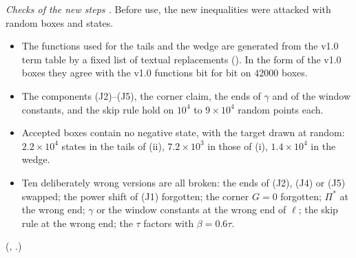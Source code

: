 \emph{Checks of the new steps \numst.}
Before use, the new inequalities were attacked with random boxes and states.
\begin{itemize}
\item The functions used for the tails and the wedge are generated from the v1.0 term table by a fixed list of textual replacements ().
  In the form of the v1.0 boxes they agree with the v1.0 functions bit for bit on $42000$ boxes.
\item The components (J2)--(J5), the corner claim, the ends of $\gamma$ and of the window constants, and the skip rule hold on $10^4$ to $9\times10^4$ random points each.
\item Accepted boxes contain no negative state, with the target drawn at random: $2.2\times10^{4}$ states in the tails of (ii), $7.2\times10^{3}$ in those of (i), $1.4\times10^{4}$ in the wedge.
\item Ten deliberately wrong versions are all broken: the ends of (J2), (J4) or (J5) swapped; the power shift of (J1) forgotten; the corner $G=0$ forgotten; $\Pi^*$ at the wrong end; $\gamma$ or the window constants at the wrong end of $\ell$; the skip rule at the wrong end; the $\tau$ factors with $\beta=0.6\tau$.
\end{itemize}
(, .)

